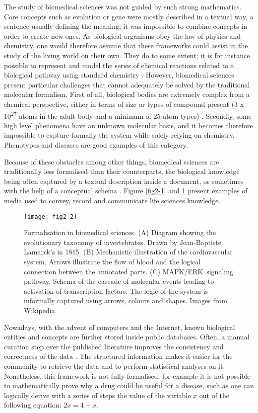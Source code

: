The study of biomedical sciences was not guided by such strong mathematics. Core concepts such as evolution or gene were mostly described in a textual way, a sentence usually defining the meaning; it was impossible to combine concepts in order to create new ones. As biological organisms obey the law of physics and chemistry, one would therefore assume that these frameworks could assist in the study of the living world on their own. They do to some extent; it is for instance possible to represent and model the series of chemical reactions related to a biological pathway using standard chemistry \citep{le2006biomodels}. However, biomedical sciences present particular challenges that cannot adequately be solved by the traditional molecular formalism. First of all, biological bodies are extremely complex from a chemical perspective, either in terms of size or types of compound present (3 x 10\textsuperscript{27} atoms in the adult body and a minimum of 25 atom types) \citep{nielsen1999ultratrace}. Secondly, some high level phenomena have an unknown molecular basis, and it becomes therefore impossible to capture formally the system while solely relying on chemistry. Phenotypes and diseases are good examples of this category.

Because of these obstacles among other things, biomedical sciences are traditionally less formalised than their counterparts, the biological knowledge being often captured by a textual description inside a document, or sometimes with the help of a conceptual schema \citep{lazebnik2002can}. Figure \ref{fig2-1} and \ref{fig2-2} present examples of media used to convey, record and communicate life sciences knowledge.

\begin{figure}[ht]
    \centering
    \texttt{[image: fig2-2]}
    \caption{Formalisation in biomedical sciences. (A) Diagram showing the evolutionary taxonomy of invertebrates. Drawn by Jean-Baptiste Lamarck’s in 1815. (B) Mechanistic illustration of the cardiovascular system. Arrows illustrate the flow of blood and the logical connection between the annotated parts. (C) MAPK/ERK signaling pathway. Schema of the cascade of molecular events leading to activation of transcription factors. The logic of the system is informally captured using arrows, colours and shapes. Images from Wikipedia.}
    \label{fig2-2}
\end{figure}

Nowadays, with the advent of computers and the Internet, known biological entities and concepts are further stored inside public databases. Often, a manual curation step over the published literature improves the consistency and correctness of the data \citep{brooksbank2014european}. The structured information makes it easier for the community to retrieve the data and to perform statistical analyses on it. Nonetheless, this framework is not fully formalised; for example it is not possible to mathematically prove why a drug could be useful for a disease, such as one can logically derive with a series of steps the value of the variable $ x $ out of the following equation: $ 2x = 4 + x $.

